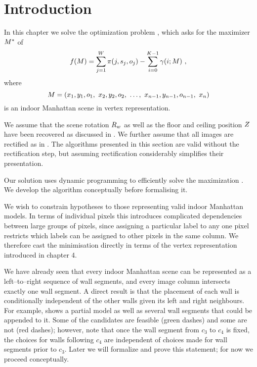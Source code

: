 \section{Introduction}

In this chapter we solve the optimization problem ,
which asks for the maximizer $\OptimalScene$ of
\begin{equation}
  \Objective(\Scene) =
    \sum_{j=1}^{\Width} \PixelPayoff(j,\seam_j,\WallOrient_j) -
    \sum_{i=0}^{\NumWalls-1} \CornerPenalty(i;\Scene) ~,
\end{equation}
where
\begin{equation}
  \Scene =
  ( x_1,y_1,\WallOrient_1,
   ~x_2,y_2,\WallOrient_2,
   ~\ldots,
   ~x_{n-1},y_{n-1},\WallOrient_{n-1}, ~x_n )
\end{equation}
is an indoor Manhattan scene in vertex representation.

We assume that the scene rotation $\SceneR$ as well as the floor and
ceiling position $\Zs$ have been recovered as discussed in
. We further assume that all images are rectified
as in . The algorithms presented in this section
are valid without the rectification step, but assuming rectification
considerably simplifies their presentation.

Our solution uses dynamic programming to efficiently solve the
maximization . We develop the algorithm conceptually
before formalising it.

We wish to constrain hypotheses to those representing valid indoor
Manhattan models. In terms of individual pixels this introduces
complicated dependencies between large groups of pixels, since
assigning a particular label to any one pixel restricts which labels
can be assigned to other pixels in the same column. We therefore cast
the minimisation directly in terms of the vertex representation
introduced in chapter 4.

We have already seen that every indoor Manhattan scene can be
represented as a left--to--right sequence of wall segments, and every
image column intersects exactly one wall segment. A direct result is
that the placement of each wall is conditionally independent of the
other walls given its left and right neighbours. For example,
 shows a partial model as well as several wall
segments that could be appended to it. Some of the candidates are
feasible (green dashes) and some are not (red dashes); however, note
that once the wall segment from $c_3$ to $c_4$ is fixed, the choices
for walls following $c_4$ are independent of choices made for wall
segments prior to $c_3$. Later we will formalize and prove this
statement; for now we proceed conceptually.

